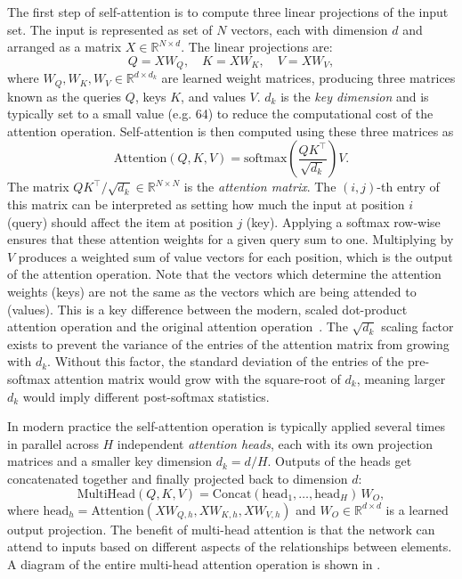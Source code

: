 The first step of self-attention is to compute three linear projections of the input set.
The input is represented as set of $N$ vectors, each with dimension $d$ and arranged as a matrix $X \in \mathbb{R}^{N \times d}$.
The linear projections are:
\begin{equation}
    Q = X W_Q, \quad K = X W_K, \quad V = X W_V,
    \label{eqn:qkv}
\end{equation}
where $W_Q, W_K, W_V \in \mathbb{R}^{d \times d_k}$ are learned weight matrices, producing three matrices known as the queries $Q$, keys $K$, and values $V$.
$d_k$ is the \textit{key dimension} and is typically set to a small value (e.g. 64) to reduce the computational cost of the attention operation.
Self-attention is then computed using these three matrices as
\begin{equation}
    \text{Attention}(Q, K, V) = \text{softmax}\!\left( \frac{Q K^\top}{\sqrt{d_k}} \right) V.
    \label{eqn:attention}
\end{equation}
The matrix $Q K^\top / \sqrt{d_k} \in \mathbb{R}^{N \times N}$ is the \textit{attention matrix}.
The $(i,j)$-th entry of this matrix can be interpreted as setting how much the input at position $i$ (query) should affect the item at position $j$ (key).
Applying a softmax row-wise ensures that these attention weights for a given query sum to one.
Multiplying by $V$ produces a weighted sum of value vectors for each position, which is the output of the attention operation.
Note that the vectors which determine the attention weights (keys) are not the same as the vectors which are being attended to (values).
This is a key difference between the modern, scaled dot-product attention operation and the original attention operation~\cite{bahdanau2014neural}.
The $\sqrt{d_k}$ scaling factor exists to prevent the variance of the entries of the attention matrix from growing with $d_k$.
Without this factor, the standard deviation of the entries of the pre-softmax attention matrix would grow with the square-root of $d_k$, meaning larger $d_k$ would imply different post-softmax statistics.

In modern practice the self-attention operation is typically applied several times in parallel across $H$ independent \textit{attention heads}, each with its own projection matrices and a smaller key dimension $d_k = d / H$.
Outputs of the heads get concatenated together and finally projected back to dimension $d$:
\begin{equation}
    \text{MultiHead}(Q, K, V) = \text{Concat}(\text{head}_1, \ldots, \text{head}_H) \, W_O,
    \label{eqn:multihead}
\end{equation}
where $\text{head}_h = \text{Attention}(X W_{Q,h}, X W_{K,h}, X W_{V,h})$ and $W_O \in \mathbb{R}^{d \times d}$ is a learned output projection.
The benefit of multi-head attention is that the network can attend to inputs based on different aspects of the relationships between elements.
A diagram of the entire multi-head attention operation is shown in .

